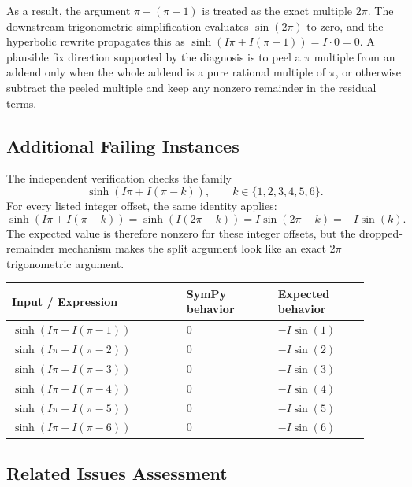 \documentclass[11pt]{article}
\begin{document}
As a result, the argument \(\pi+(\pi-1)\) is treated as the exact multiple
\(2\pi\). The downstream trigonometric simplification evaluates
\(\sin(2\pi)\) to zero, and the hyperbolic rewrite propagates this as
\(\sinh(I\pi+I(\pi-1)) = I\cdot 0 = 0\). A plausible fix direction supported
by the diagnosis is to peel a \(\pi\) multiple from an addend only when the
whole addend is a pure rational multiple of \(\pi\), or otherwise subtract the
peeled multiple and keep any nonzero remainder in the residual terms.

\subsection{Additional Failing Instances}

The independent verification checks the family
\[
  \sinh(I\pi + I(\pi-k)), \qquad k \in \{1,2,3,4,5,6\}.
\]
For every listed integer offset, the same identity applies:
\[
  \sinh(I\pi + I(\pi-k))=\sinh(I(2\pi-k))
  = I\sin(2\pi-k) = -I\sin(k).
\]
The expected value is therefore nonzero for these integer offsets, but the
dropped-remainder mechanism makes the split argument look like an exact
\(2\pi\) trigonometric argument.

\begin{center}
\renewcommand{\arraystretch}{1.3}
\begin{tabular}{@{}>{\raggedright\arraybackslash}p{0.44\linewidth}>{\raggedright\arraybackslash}p{0.23\linewidth}>{\raggedright\arraybackslash}p{0.23\linewidth}@{}}
\toprule
\textbf{Input / Expression} & \textbf{SymPy behavior} & \textbf{Expected behavior} \\
\midrule
\(\sinh(I\pi+I(\pi-1))\) & \(0\) & \(-I\sin(1)\) \\
\(\sinh(I\pi+I(\pi-2))\) & \(0\) & \(-I\sin(2)\) \\
\(\sinh(I\pi+I(\pi-3))\) & \(0\) & \(-I\sin(3)\) \\
\(\sinh(I\pi+I(\pi-4))\) & \(0\) & \(-I\sin(4)\) \\
\(\sinh(I\pi+I(\pi-5))\) & \(0\) & \(-I\sin(5)\) \\
\(\sinh(I\pi+I(\pi-6))\) & \(0\) & \(-I\sin(6)\) \\
\bottomrule
\end{tabular}
\end{center}

\subsection{Related Issues Assessment}
\end{document}

